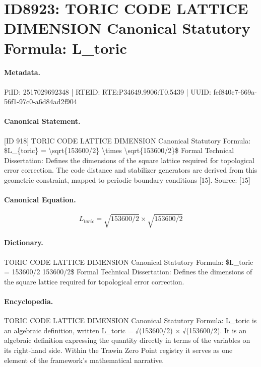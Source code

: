\section*{ID8923: TORIC CODE LATTICE DIMENSION Canonical Statutory Formula: L\_toric}
\paragraph{Metadata.}
PiID: 2517029692348 | RTEID: RTE:P34649.9906:T0.5439 | UUID: fef840c7-669a-56f1-97c0-a6d84ad2f904

\paragraph{Canonical Statement.}
[ID 918] TORIC CODE LATTICE DIMENSION Canonical Statutory Formula: \$L\_\{toric\} = \textbackslash{}sqrt\{153600/2\} \textbackslash{}times \textbackslash{}sqrt\{153600/2\}\$ Formal Technical Dissertation: Defines the dimensions of the square lattice required for topological error correction. The code distance and stabilizer generators are derived from this geometric constraint, mapped to periodic boundary conditions [15]. Source: [15]

\paragraph{Canonical Equation.}
\[
L_{toric} = \sqrt{153600/2} \times \sqrt{153600/2}
\]

\paragraph{Dictionary.}
TORIC CODE LATTICE DIMENSION Canonical Statutory Formula: \$L\_toric = 153600/2 153600/2\$ Formal Technical Dissertation: Defines the dimensions of the square lattice required for topological error correction.

\paragraph{Encyclopedia.}
TORIC CODE LATTICE DIMENSION Canonical Statutory Formula: L\_toric is an algebraic definition, written L\_toric = √(153600/2) × √(153600/2). It is an algebraic definition expressing the quantity directly in terms of the variables on its right-hand side. Within the Trawin Zero Point registry it serves as one element of the framework's mathematical narrative.
